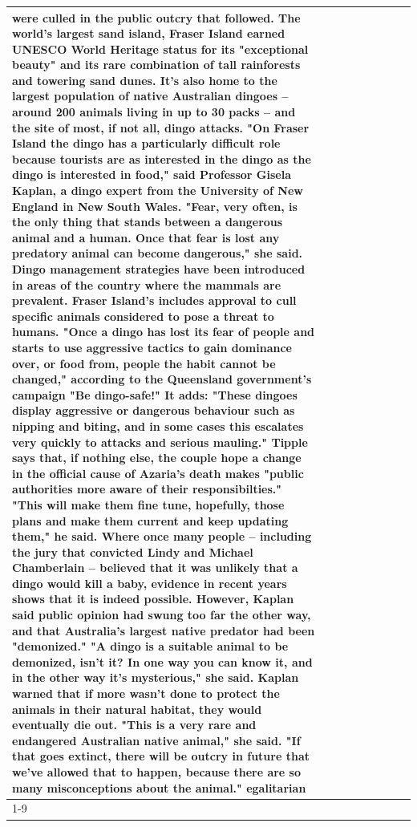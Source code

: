 \begin{table}[H]
\begin{tabular}{lllrlllll}
were culled in the public outcry that followed. The world's largest sand island, Fraser Island earned UNESCO World Heritage status for its "exceptional beauty" and its rare combination of tall rainforests and towering sand dunes. It's also home to the largest population of native Australian dingoes -- around 200 animals living in up to 30 packs -- and the site of most, if not all, dingo attacks. "On Fraser Island the dingo has a particularly difficult role because tourists are as interested in the dingo as the dingo is interested in food," said Professor Gisela Kaplan, a dingo expert from the University of New England in New South Wales. "Fear, very often, is the only thing that stands between a dangerous animal and a human. Once that fear is lost any predatory animal can become dangerous," she said. Dingo management strategies have been introduced in areas of the country where the mammals are prevalent. Fraser Island's includes approval to cull specific animals considered to pose a threat to humans. "Once a dingo has lost its fear of people and starts to use aggressive tactics to gain dominance over, or food from, people the habit cannot be changed," according to the Queensland government's campaign "Be dingo-safe!" It adds: "These dingoes display aggressive or dangerous behaviour such as nipping and biting, and in some cases this escalates very quickly to attacks and serious mauling." Tipple says that, if nothing else, the couple hope a change in the official cause of Azaria's death makes "public authorities more aware of their responsibilties." "This will make them fine tune, hopefully, those plans and make them current and keep updating them," he said. Where once many people -- including the jury that convicted Lindy and Michael Chamberlain -- believed that it was unlikely that a dingo would kill a baby, evidence in recent years shows that it is indeed possible. However, Kaplan said public opinion had swung too far the other way, and that Australia's largest native predator had been "demonized." "A dingo is a suitable animal to be demonized, isn't it? In one way you can know it, and in the other way it's mysterious," she said. Kaplan warned that if more wasn't done to protect the animals in their natural habitat, they would eventually die out. "This is a very rare and endangered Australian native animal," she said. "If that goes extinct, there will be outcry in future that we've allowed that to happen, because there are so many misconceptions about the animal." egalitarian \\
\cline{1-9}

\end{tabular}
\end{table}
